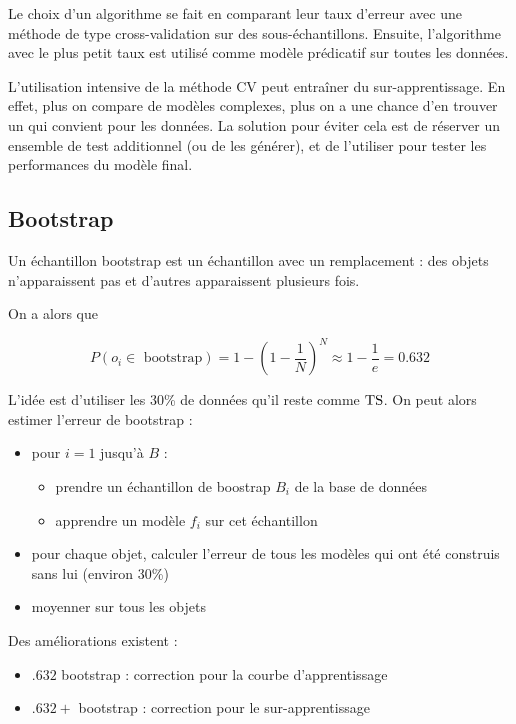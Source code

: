 	Le choix d'un algorithme se fait en comparant leur taux d'erreur avec une méthode de type cross-validation sur des sous-échantillons. Ensuite, l'algorithme avec le plus petit taux est utilisé comme modèle prédicatif sur toutes les données.

	L'utilisation intensive de la méthode CV peut entraîner du sur-apprentissage. En effet, plus on compare de modèles complexes, plus on a une chance d'en trouver un qui convient pour les données. La solution pour éviter cela est de réserver un ensemble de test additionnel (ou de les générer), et de l'utiliser pour tester les performances du modèle final.
	
	\subsection{Bootstrap}
	
	Un échantillon bootstrap est un échantillon avec un remplacement : des objets n'apparaissent pas et d'autres apparaissent plusieurs fois.
	
	
	On a alors que
	
	$$P(o_i \in \text{ bootstrap}) = 1 - (1 - \frac{1}{N})^N \approx 1 - \frac{1}{e} = 0.632$$
	
	L'idée est d'utiliser les 30\% de données qu'il reste comme $\text{TS}$. On peut alors estimer l'erreur de bootstrap :
	
	\begin{itemize}
		\item pour $i = 1$ jusqu'à $B$ :
		
		\begin{itemize}
			\item prendre un échantillon de boostrap $B_i$ de la base de données
			\item apprendre un modèle $f_i$ sur cet échantillon
		\end{itemize}
		
		\item pour chaque objet, calculer l'erreur de tous les modèles qui ont été construis sans lui (environ 30\%)
		\item moyenner sur tous les objets
	\end{itemize}
	
	Des améliorations existent :
	
	\begin{itemize}
		\item $.632$ bootstrap : correction pour la courbe d'apprentissage
		\item $.632+$ bootstrap : correction pour le sur-apprentissage
	\end{itemize}
	
